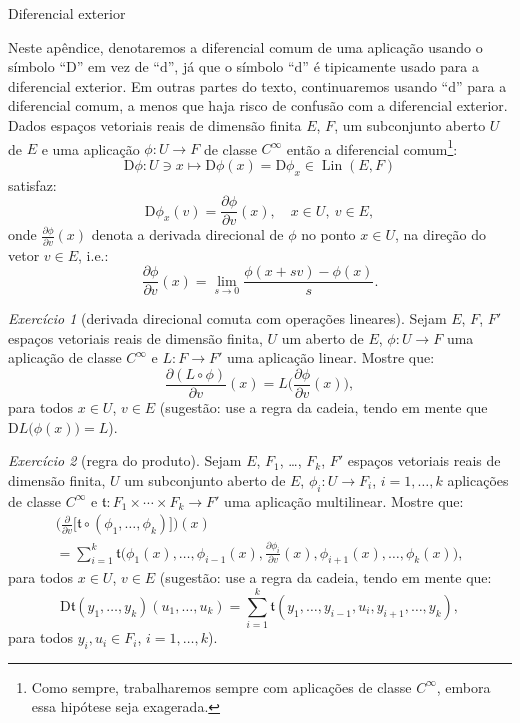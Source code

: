 \documentclass[oneside,11pt]{amsart}
\newcommand{\dd}{\mathrm d}
\newcommand{\Dd}{\mathrm D}
\DeclareMathOperator{\Lin}{Lin}
\theoremstyle{remark}\newtheorem{exercise}{Exercício}[section]
\theoremstyle{plain}\newtheorem{teo}{Teorema}[section]
\theoremstyle{plain}\newtheorem{lem}[teo]{Lema}
\theoremstyle{plain}\newtheorem{prop}[teo]{Proposição}
\theoremstyle{definition}\newtheorem{defin}[teo]{Definição}
\theoremstyle{remark}\newtheorem{rem}[teo]{Observação}
\theoremstyle{definition}\newtheorem{example}[teo]{Exemplo}
\numberwithin{equation}{section}
\begin{document}
\begin{section}{Diferencial exterior}
\label{sec:difext}

Neste apêndice, denotaremos a diferencial comum de uma aplicação usando o símbolo
``$\Dd$'' em vez de ``$\dd$'', já que o símbolo ``$\dd$'' é tipicamente usado para a
diferencial exterior. Em outras partes do texto, continuaremos usando ``$\dd$'' para a diferencial comum, a menos que haja risco de confusão com a diferencial exterior.
Dados espaços vetoriais reais de dimensão finita $E$, $F$, um subconjunto
aberto $U$ de $E$ e uma aplicação $\phi:U\to F$ de classe $C^\infty$ então a diferencial comum\footnote{%
Como sempre, trabalharemos sempre com aplicações de classe $C^\infty$, embora essa hipótese seja exagerada.}:
\[\Dd\phi:U\ni x\longmapsto\Dd\phi(x)=\Dd\phi_x\in\Lin(E,F)\]
satisfaz:
\[\Dd\phi_x(v)=\frac{\partial\phi}{\partial v}(x),\quad x\in U,\ v\in E,\]
onde $\frac{\partial\phi}{\partial v}(x)$ denota a derivada direcional de $\phi$ no ponto $x\in U$, na direção do vetor $v\in E$, i.e.:
\[\frac{\partial\phi}{\partial v}(x)=\lim_{s\to0}\frac{\phi(x+sv)-\phi(x)}s.\]

\begin{exercise}[derivada direcional comuta com operações lineares]\label{exe:oplinderdir}
Sejam $E$, $F$, $F'$ espaços vetoriais reais de dimensão finita, $U$ um aberto de $E$, $\phi:U\to F$ uma aplicação de classe $C^\infty$ e $L:F\to F'$ uma
aplicação linear. Mostre que:
\[\frac{\partial(L\circ\phi)}{\partial v}(x)=L\Big(\frac{\partial\phi}{\partial v}(x)\Big),\]
para todos $x\in U$, $v\in E$ (sugestão: use a regra da cadeia, tendo em mente que $\Dd L\big(\phi(x)\big)=L$).
\end{exercise}

\begin{exercise}[regra do produto]\label{exe:regraproduto}
Sejam $E$, $F_1$, \dots, $F_k$, $F'$ espaços vetoriais reais de dimensão finita, $U$ um subconjunto
aberto de $E$, $\phi_i:U\to F_i$, $i=1,\ldots,k$ aplicações de classe $C^\infty$
e $\mathfrak t:F_1\times\cdots\times F_k\to F'$ uma aplicação multilinear. Mostre que:
\begin{multline*}
\Big(\frac{\partial}{\partial v}\big[\mathfrak t\circ(\phi_1,\ldots,\phi_k)\big]\Big)(x)\\
=\sum_{i=1}^k\mathfrak t\Big(\phi_1(x),\ldots,\phi_{i-1}(x),\frac{\partial\phi_i}{\partial v}(x),\phi_{i+1}(x),\ldots,\phi_k(x)\Big),
\end{multline*}
para todos $x\in U$, $v\in E$ (sugestão: use a regra da cadeia, tendo em mente que:
\[\Dd\mathfrak t(y_1,\ldots,y_k)(u_1,\ldots,u_k)=\sum_{i=1}^k\mathfrak t(y_1,\ldots,y_{i-1},u_i,y_{i+1},\ldots,y_k),\]
para todos $y_i,u_i\in F_i$, $i=1,\ldots,k$).
\end{exercise}


\end{section}
\end{document}

